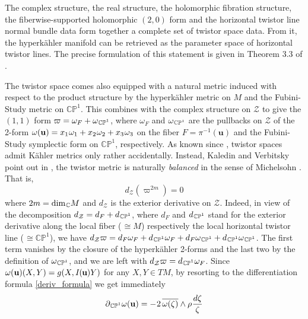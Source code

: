 \documentclass[11pt]{amsart}
\theoremstyle{remark}
\theoremstyle{remark}
\theoremstyle{definition}
\theoremstyle{definition}
\theoremstyle{definition}
\newcommand{\IU}{I\nhp(\nhp\mathbf{u}\hspace{-0.2pt})} %
\newcommand{\0}{{\scriptstyle 0'}} %
\newcommand{\1}{{\scriptstyle 1'}}
\newcommand{\pt}{\hspace{1pt}} %
\newcommand{\hp}{\hspace{0.5pt}} %
\newcommand{\nhp}{\hspace{-0.5pt}} %
\begin{document}
The complex structure, the real structure, the holomorphic fibration structure, the fiber\-wise-supported holomorphic $(2,0)$ form and the horizontal twistor line normal bundle data form together a complete set of twistor space data. From it, the hyperk\"ahler manifold can be retrieved as the parameter space of horizontal twistor lines. The precise formulation of this statement is given in Theorem 3.3 of \cite{MR877637}. 

The twistor space comes also equipped with a natural metric induced with respect to the product structure by the hyperk\"ahler metric on $M$ and the Fubini-Study metric on $\mathbb{CP}^1$. This combines with the complex structure on $\mathcal{Z}$ to give the $(1,1)$ form $\varpi = \omega_F + \omega_{\hp\smash{\mathbb{CP}^1}}$, where $\omega_F$ and $\omega_{\hp\smash{\mathbb{CP}^1}}$ are the pullbacks on $\mathcal{Z}$ of the 2-form $\omega(\mathbf{u}) = x_1\hp\omega_1 + x_2\hp \omega_2 + x_3\hp \omega_3$ on the fiber $F= \pi^{-1}(\mathbf{u})$ and the Fubini-Study symplectic form on $\mathbb{CP}^1$, respectively. As known since \cite{MR623721}, twistor spaces admit K\"ahler metrics only rather accidentally. Instead, Kaledin and Verbitsky point out in \cite[Proposition 4.5]{MR1669956}, the twistor metric is naturally \textit{balanced} in the sense of Michelsohn \cite{MR688351}. That is, 
\begin{equation}
d_{\mathcal{Z}} (\varpi^{2m}) = 0 
\end{equation}
where $2m = \dim_{\hp \mathbb{C}}\!M$ and $d_{\mathcal{Z}}$ is the exterior derivative on $\mathcal{Z}$. Indeed, in view of the decomposition $d_{\mathcal{Z}} = d_F + d_{\hp\smash{\mathbb{CP}^1}}$, where $d_F$ and $d_{\hp\smash{\mathbb{CP}^1}}$ stand for the exterior derivative along the local fiber (\mbox{$\pt \cong M$}) respectively the local horizontal twistor line (\mbox{$\pt \cong \mathbb{CP}^1$}), we have $d_{\mathcal{Z}}\varpi = d_F\omega_F + d_{\hp\smash{\mathbb{CP}^1}}\omega_F + d_F \omega_{\hp\smash{\mathbb{CP}^1}} + d_{\hp\smash{\mathbb{CP}^1}}\omega_{\hp\smash{\mathbb{CP}^1}}$.  The first term vanishes by the closure of the hyperk\"ahler 2-forms and the last two by the definition of $\omega_{\hp\smash{\mathbb{CP}^1}}$, and we are left with $d_{\mathcal{Z}}\varpi = d_{\hp\smash{\mathbb{CP}^1}}\omega_F$. Since $\omega(\mathbf{u})(X,Y) = g(X,\IU Y)$ for any $X,Y \in TM$, by resorting to the differentiation formula \eqref{deriv_formula} we get immediately
\begin{equation}
\partial_{\hp\smash{\mathbb{CP}^1}} \omega(\mathbf{u}) = - \hp 2 \, \overline{\omega(\zeta)} \wedge \rho \hp \frac{d\zeta}{\zeta}
\end{equation}
\end{document}
